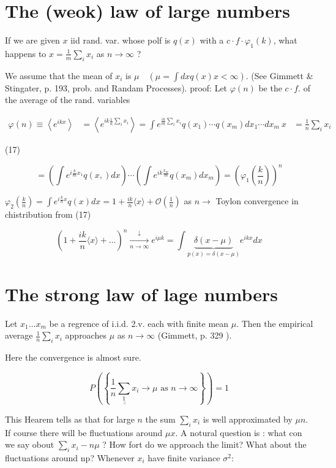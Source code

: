 \section*{The (weok) law of large numbers}
If we are given $x$ iid rand. var. whose polf is $q(x)$ with a $c \cdot f \cdot \varphi_{1}(k)$, what happens to $x=\frac{1}{m} \sum_{i} x_{i}$ as $n \rightarrow \infty$ ?

We assume that the mean of $x_{i}$ is $\mu \quad\left(\mu=\int d x q(x) x<\infty\right)$. (See Gimmett & Stingater, p. 193, prob. and Randam Processes). proof:
Let $\varphi(n)$ be the $c \cdot f$. of the average of the rand. variables

$$ \begin{aligned} \varphi(n) \equiv\left\langle e^{i k x}\right\rangle & =\left\langle e^{i k \frac{1}{n} \sum_{i} x_{i}}\right\rangle=\int e^{\frac{i k}{m} \sum_{i} x_{i}} q\left(x_{1}\right) \cdots q\left(x_{m}\right) d x_{1} \cdots d x_{m} \ x & =\frac{1}{n} \sum_{i} x_{i} \end{aligned} $$ 

(17)

$$ =\left(\int e^{i \frac{k}{m} x_{1}} q(x,) d x\right) \cdots\left(\int e^{i k \frac{x_{m}}{m}} q\left(x_{m}\right) d x_{m}\right)=\left(\varphi_{1}\left(\frac{k}{n}\right)\right)^{n} $$ 

$\varphi_{2}\left(\frac{k}{n}\right)=\int e^{i \frac{k}{n} x} q(x) d x=1+\frac{i k}{n}\langle x\rangle+\mathcal{O}\left(\frac{1}{n}\right)$ as $n \rightarrow$
Toylon convergence in chistribution
from (17)

$$ \left(1+\frac{i k}{n}\langle x\rangle+\ldots\right)^{n} \xrightarrow[n \rightarrow \infty]{\downarrow} e^{i \mu k}=\int \underbrace{\delta(x-\mu)}_{p(x)=\delta(x-\mu)} e^{i k x} d x $$ 

\section*{The strong law of lage numbers}
Let $x_{1} \ldots x_{m}$ be a regrence of i.i.d. 2.v. each with finite mean $\mu$. Then the empirical average $\frac{1}{n} \sum_{i} x_{i}$ approaches $\mu$ as $n \rightarrow \infty$ (Gimmett, p. 329 ).

Here the convergence is almost sure.

$$ P\left(\left\{\underline{\underline{\frac{1}{n} \sum_{1} x_{i}}} \rightarrow \mu \text { as } n \rightarrow \infty\right\}\right)=1 $$ 

This Hearem tells as that for large $n$ the sum $\sum_{i} x_{i}$ is well approximated by $\mu n$. If course there will be fluctuations around $\mu x$. A notural question is : what con we say obout $\sum_{i} x_{i}-n \mu$ ? How fort do we approach the limit? What about the fluctuations around np? 
Whenever $x_{i}$ have finite variance $\sigma^{2}$:

